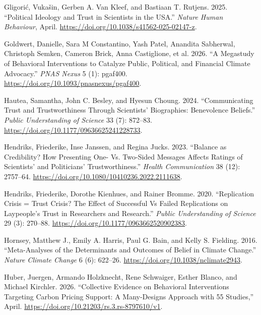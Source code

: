 \documentclass[
  letterpaper,
  DIV=11,
  numbers=noendperiod]{scrartcl}
\newlength{\cslhangindent}
\newenvironment{CSLReferences}[2] %
 {\begin{list}{}{%
  \setlength{\itemindent}{0pt}
  \setlength{\leftmargin}{0pt}
  \setlength{\parsep}{0pt}
  \ifodd #1
   \setlength{\leftmargin}{\cslhangindent}
   \setlength{\itemindent}{-1\cslhangindent}
  \fi
  \setlength{\itemsep}{#2\baselineskip}}}
 {\end{list}}
\begin{document}
\begin{CSLReferences}{1}{0}
Gligorić, Vukašin, Gerben A. Van Kleef, and Bastiaan T. Rutjens. 2025.
{``Political Ideology and Trust in Scientists in the USA.''}
\emph{Nature Human Behaviour}, April.
\url{https://doi.org/10.1038/s41562-025-02147-z}.

Goldwert, Danielle, Sara M Constantino, Yash Patel, Anandita Sabherwal,
Christoph Semken, Cameron Brick, Anna Castiglione, et al. 2026. {``A
Megastudy of Behavioral Interventions to Catalyze Public, Political, and
Financial Climate Advocacy.''} \emph{PNAS Nexus} 5 (1): pgaf400.
\url{https://doi.org/10.1093/pnasnexus/pgaf400}.

Hautea, Samantha, John C. Besley, and Hyesun Choung. 2024.
{``Communicating Trust and Trustworthiness Through Scientists{'}
Biographies: Benevolence Beliefs.''} \emph{Public Understanding of
Science} 33 (7): 872--83.
\url{https://doi.org/10.1177/09636625241228733}.

Hendriks, Friederike, Inse Janssen, and Regina Jucks. 2023. {``Balance
as Credibility? How Presenting One- Vs. Two-Sided Messages Affects
Ratings of Scientists{'} and Politicians{'} Trustworthiness.''}
\emph{Health Communication} 38 (12): 2757--64.
\url{https://doi.org/10.1080/10410236.2022.2111638}.

Hendriks, Friederike, Dorothe Kienhues, and Rainer Bromme. 2020.
{``Replication Crisis = Trust Crisis? The Effect of Successful Vs Failed
Replications on Laypeople{'}s Trust in Researchers and Research.''}
\emph{Public Understanding of Science} 29 (3): 270--88.
\url{https://doi.org/10.1177/0963662520902383}.

Hornsey, Matthew J., Emily A. Harris, Paul G. Bain, and Kelly S.
Fielding. 2016. {``Meta-Analyses of the Determinants and Outcomes of
Belief in Climate Change.''} \emph{Nature Climate Change} 6 (6):
622--26. \url{https://doi.org/10.1038/nclimate2943}.

Huber, Juergen, Armando Holzknecht, Rene Schwaiger, Esther Blanco, and
Michael Kirchler. 2026. {``Collective Evidence on Behavioral
Interventions Targeting Carbon Pricing Support: A Many-Designs Approach
with 55 Studies,''} April.
\url{https://doi.org/10.21203/rs.3.rs-8797610/v1}.


\end{CSLReferences}
\end{document}
